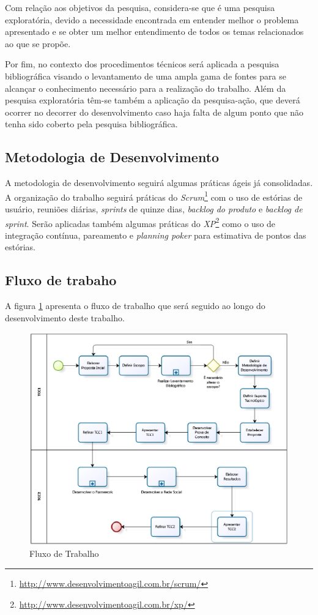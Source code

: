 Com relação aos objetivos da pesquisa, considera-se que é uma pesquisa exploratória, devido a necessidade encontrada em entender melhor o problema apresentado e se obter um melhor entendimento de todos os temas relacionados ao que se propõe.

Por fim, no contexto dos procedimentos técnicos será aplicada a pesquisa bibliográfica visando o levantamento de uma ampla gama de fontes para se alcançar o conhecimento necessário para a realização do trabalho. Além da pesquisa exploratória têm-se também a aplicação da pesquisa-ação, que deverá ocorrer no decorrer do desenvolvimento caso haja falta de algum ponto que não tenha sido coberto pela pesquisa bibliográfica.

\subsection{Metodologia de Desenvolvimento}

A metodologia de desenvolvimento seguirá algumas práticas ágeis já consolidadas. A organização do trabalho seguirá práticas do \textit{Scrum}\footnote{\url{http://www.desenvolvimentoagil.com.br/scrum/}} com o uso de estórias de usuário, reuniões diárias, \textit{sprints} de quinze dias, \textit{backlog do produto} e \textit{backlog de sprint}. Serão aplicadas também algumas práticas do \textit{XP}\footnote{\url{http://www.desenvolvimentoagil.com.br/xp/}} como o uso de integração contínua, pareamento e \textit{planning poker} para estimativa de pontos das estórias.

\subsection{Fluxo de trabaho}

A figura \ref{processo tcc} apresenta o fluxo de trabalho que será seguido ao longo do desenvolvimento deste trabalho.

\newpage

\begin{figure}
	\centering
	\includegraphics[scale=0.8]{figuras/capitulo4/processo_tcc.eps}
	\caption{Fluxo de Trabalho}
	\label{processo tcc}
\end{figure}

